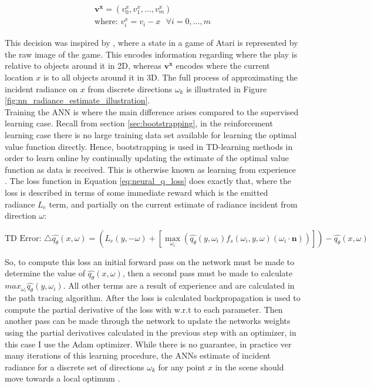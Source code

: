 \documentclass[../dissertation.tex]{subfiles}
\begin{document}
\begin{gather*}
\mathbf{v^x} = (v^x_0, v^x_1, ..., v^x_m)\\
\text{where: } v^x_i = v_i - x \ \ \ \forall i = 0, ..., m \nonumber
\end{gather*}

This decision was inspired by \cite{mnih2013playing}, where a state in a game of Atari is represented by the raw image of the game. This encodes information regarding where the play is relative to objects around it in 2D, whereas $\mathbf{v^x}$ encodes where the current location $x$ is to all objects around it in 3D. The full process of approximating the incident radiance on $x$ from discrete directions $\omega_k$ is illustrated in Figure \ref{fig:nn_radiance_estimate_illustration}.\\



Training the ANN is where the main difference arises compared to the supervised learning case. Recall from section \ref{sec:bootstrapping}, in the reinforcement learning case there is no large training data set available for learning the optimal value function directly. Hence, bootstrapping is used in TD-learning methods in order to learn online by continually updating the estimate of the optimal value function as data is received. This is otherwise known as learning from experience \cite{sutton2011reinforcement}. The loss function in Equation \ref{eq:neural_q_loss} does exactly that, where the loss is described in terms of some immediate reward which is the emitted radiance $L_e$ term, and partially on the current estimate of radiance incident from direction $\omega$:

$$\text{TD Error: } \triangle \hat{q_\theta}(x, \omega) = \left( L_e(y, -\omega) + \left[ \max_{\omega_i} \left(\hat{q_\theta}(y, \omega_i) f_s(\omega_i, y, \omega) (\omega_i \cdot \mathbf{n}) \right) \right] \right) - \hat{q_\theta}(x, \omega)$$

So, to compute this loss an initial forward pass on the network must be made to determine the value of $\hat{q_\theta}(x, \omega)$, then a second pass must be made to calculate $max_{\omega_i} \hat{q_\theta}(y, \omega_i)$. All other terms are a result of experience and are calculated in the path tracing algorithm. After the loss is calculated backpropagation is used to compute the partial derivative of the loss with w.r.t to each parameter. Then another pass can be made through the network to update the networks weights using the partial derivatives calculated in the previous step with an optimizer, in this case I use the Adam optimizer. While there is no guarantee, in practice ver many iterations of this learning procedure, the ANNs estimate of incident radiance for a discrete set of directions $\omega_k$ for any point $x$ in the scene should move towards a local optimum \cite{deep_rl_function_approx}.
\end{document}
